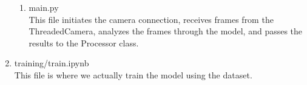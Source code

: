 \begin{enumerate}
\begin{enumerate}
                                  \item main.py\\
                                        This file initiates the camera connection, receives frames from the ThreadedCamera, analyzes the frames through the model, and passes the results to the Processor class.\\
                              \end{enumerate}

                        \item training/train.ipynb\\
                              This file is where we actually train the model using the dataset.\\
                    \end{enumerate}